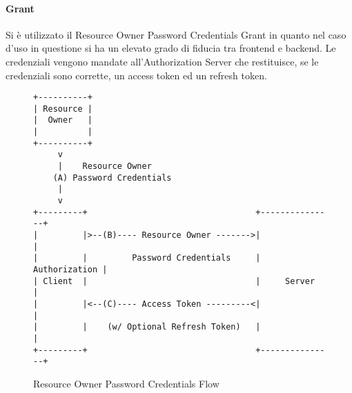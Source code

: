 \paragraph{Grant}
Si è utilizzato il Resource Owner Password Credentials Grant \cite{GRANT} in quanto nel caso d'uso in questione si ha un elevato grado di fiducia tra frontend e backend.
Le credenziali vengono mandate all'Authorization Server che restituisce, se le credenziali sono corrette, un access token ed un refresh token.\\
\begin{figure}[h]
\begin{center}
\label{fig:grantflow}
\begin{verbatim}
+----------+
| Resource |
|  Owner   |
|          |
+----------+
     v
     |    Resource Owner
    (A) Password Credentials
     |
     v
+---------+                                  +---------------+
|         |>--(B)---- Resource Owner ------->|               |
|         |         Password Credentials     | Authorization |
| Client  |                                  |     Server    |
|         |<--(C)---- Access Token ---------<|               |
|         |    (w/ Optional Refresh Token)   |               |
+---------+                                  +---------------+

\end{verbatim}
\caption{Resource Owner Password Credentials Flow \cite{GRANT}}
\end{center}
\end{figure}
\FloatBarrier
